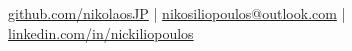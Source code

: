 \documentclass[]{friggeri-cv}
\begin{document}
\pagestyle{plain}


{
\href {https://github.com/nikolaosJP}{{github.com/nikolaosJP}} | 
\href{mailto:nikolaos.iliopoulos@s.k.u-tokyo.ac.jp}{nikosiliopoulos@outlook.com} | 
\href{https://linkedin.com/in/nickiliopoulos}{linkedin.com/in/nickiliopoulos}
}



\end{document}
